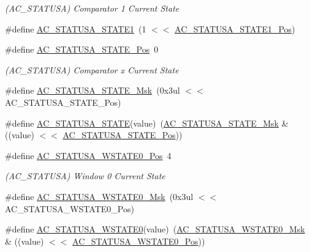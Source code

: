 \begin{DoxyCompactItemize}
\begin{DoxyCompactList}\small\item\em (A\+C\+\_\+\+S\+T\+A\+T\+U\+SA) Comparator 1 Current State \end{DoxyCompactList}\item 
\#define \mbox{\hyperlink{group___s_a_m_d21___a_c_ga99d33e2e9937779780a10eb722fdbf25}{A\+C\+\_\+\+S\+T\+A\+T\+U\+S\+A\+\_\+\+S\+T\+A\+T\+E1}}~(1 $<$$<$ \mbox{\hyperlink{group___s_a_m_d21___a_c_gaa15668b5c57b09a6b65cab3c19bef8e5}{A\+C\+\_\+\+S\+T\+A\+T\+U\+S\+A\+\_\+\+S\+T\+A\+T\+E1\+\_\+\+Pos}})
\item 
\#define \mbox{\hyperlink{group___s_a_m_d21___a_c_gac205365550f29571c942656a16ca58f6}{A\+C\+\_\+\+S\+T\+A\+T\+U\+S\+A\+\_\+\+S\+T\+A\+T\+E\+\_\+\+Pos}}~0
\begin{DoxyCompactList}\small\item\em (A\+C\+\_\+\+S\+T\+A\+T\+U\+SA) Comparator x Current State \end{DoxyCompactList}\item 
\#define \mbox{\hyperlink{group___s_a_m_d21___a_c_ga8b7c22a0a04779b5391631cc002b4e8a}{A\+C\+\_\+\+S\+T\+A\+T\+U\+S\+A\+\_\+\+S\+T\+A\+T\+E\+\_\+\+Msk}}~(0x3ul $<$$<$ A\+C\+\_\+\+S\+T\+A\+T\+U\+S\+A\+\_\+\+S\+T\+A\+T\+E\+\_\+\+Pos)
\item 
\#define \mbox{\hyperlink{group___s_a_m_d21___a_c_ga5891edfb38f48e5188febf60797d3485}{A\+C\+\_\+\+S\+T\+A\+T\+U\+S\+A\+\_\+\+S\+T\+A\+TE}}(value)~(\mbox{\hyperlink{group___s_a_m_d21___a_c_ga8b7c22a0a04779b5391631cc002b4e8a}{A\+C\+\_\+\+S\+T\+A\+T\+U\+S\+A\+\_\+\+S\+T\+A\+T\+E\+\_\+\+Msk}} \& ((value) $<$$<$ \mbox{\hyperlink{group___s_a_m_d21___a_c_gac205365550f29571c942656a16ca58f6}{A\+C\+\_\+\+S\+T\+A\+T\+U\+S\+A\+\_\+\+S\+T\+A\+T\+E\+\_\+\+Pos}}))
\item 
\#define \mbox{\hyperlink{group___s_a_m_d21___a_c_ga1339364deea09e22e0aa9d6cc65e9548}{A\+C\+\_\+\+S\+T\+A\+T\+U\+S\+A\+\_\+\+W\+S\+T\+A\+T\+E0\+\_\+\+Pos}}~4
\begin{DoxyCompactList}\small\item\em (A\+C\+\_\+\+S\+T\+A\+T\+U\+SA) Window 0 Current State \end{DoxyCompactList}\item 
\#define \mbox{\hyperlink{group___s_a_m_d21___a_c_ga286dc35efc7ab8258fb3a00eaeff1854}{A\+C\+\_\+\+S\+T\+A\+T\+U\+S\+A\+\_\+\+W\+S\+T\+A\+T\+E0\+\_\+\+Msk}}~(0x3ul $<$$<$ A\+C\+\_\+\+S\+T\+A\+T\+U\+S\+A\+\_\+\+W\+S\+T\+A\+T\+E0\+\_\+\+Pos)
\item 
\#define \mbox{\hyperlink{group___s_a_m_d21___a_c_ga072eca391c409ede84148d74d04938b3}{A\+C\+\_\+\+S\+T\+A\+T\+U\+S\+A\+\_\+\+W\+S\+T\+A\+T\+E0}}(value)~(\mbox{\hyperlink{group___s_a_m_d21___a_c_ga286dc35efc7ab8258fb3a00eaeff1854}{A\+C\+\_\+\+S\+T\+A\+T\+U\+S\+A\+\_\+\+W\+S\+T\+A\+T\+E0\+\_\+\+Msk}} \& ((value) $<$$<$ \mbox{\hyperlink{group___s_a_m_d21___a_c_ga1339364deea09e22e0aa9d6cc65e9548}{A\+C\+\_\+\+S\+T\+A\+T\+U\+S\+A\+\_\+\+W\+S\+T\+A\+T\+E0\+\_\+\+Pos}}))
$$
\end{DoxyCompactItemize}
